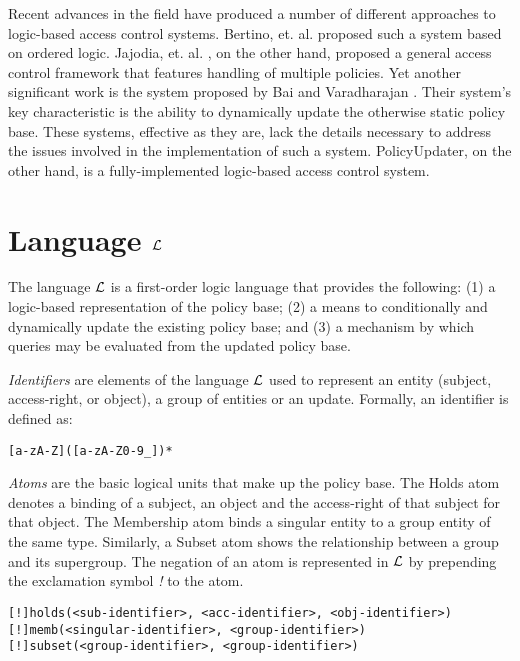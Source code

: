 \documentclass{llncs}
\begin{document}
    Recent advances in the field have produced a number of different approaches
    to logic-based access control systems. Bertino, et. al. \cite{BER} proposed
    such a system based on ordered logic. Jajodia, et. al. \cite{JAJ}, on the 
    other hand, proposed a general access control framework that features
    handling of multiple policies. Yet another significant work is the
    system proposed by Bai and Varadharajan \cite{BAI}. Their system's key
    characteristic is the ability to dynamically update the otherwise static
    policy base. These systems, effective as they are, lack the details
    necessary to address the issues involved in the implementation of such
    a system. PolicyUpdater, on the other hand, is a fully-implemented
    logic-based access control system.

  \section{Language $\cal{L}$}

    The language $\cal{L}$ is a first-order logic language that provides the
    following:  (1) a logic-based representation of the policy base; (2) a
    means to conditionally and dynamically update the existing policy base;
    and (3) a mechanism by which queries may be evaluated from the updated
    policy base.

    \noindent
    \emph{Identifiers} are elements of the language $\cal{L}$ used to represent
    an entity (subject, access-right, or object), a group of entities or an
    update. Formally, an identifier is defined as:

    \begin{verbatim}[a-zA-Z]([a-zA-Z0-9_])*\end{verbatim}

    \noindent
    \emph{Atoms} are the basic logical units that make up the policy base.
    The Holds atom denotes a binding of a subject, an object and the
    access-right of that subject for that object. The Membership atom binds
    a singular entity to a group entity of the same type. Similarly, a Subset
    atom shows the relationship between a group and its supergroup. The
    negation of an atom is represented in $\cal{L}$ by prepending the 
    exclamation symbol \emph{!} to the atom.

    \begin{verbatim}[!]holds(<sub-identifier>, <acc-identifier>, <obj-identifier>)
[!]memb(<singular-identifier>, <group-identifier>)
[!]subset(<group-identifier>, <group-identifier>)\end{verbatim}
\end{document}

